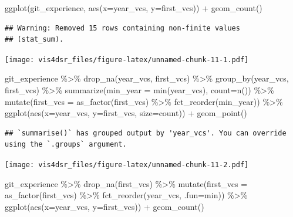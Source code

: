 \documentclass[
]{krantz}
\makeatletter
\newenvironment{Shaded}{\begin{snugshade}}{\end{snugshade}}
\newcommand{\AttributeTok}[1]{\textcolor[rgb]{0.61,0.61,0.61}{#1}}
\newcommand{\FunctionTok}[1]{\textcolor[rgb]{0,0,0}{#1}}
\newcommand{\NormalTok}[1]{#1}
\newcommand{\SpecialCharTok}[1]{\textcolor[rgb]{0,0,0}{#1}}
\newenvironment{kframe}{%
\medskip{}
\setlength{\fboxsep}{.8em}
 \def\at@end@of@kframe{}%
 \ifinner\ifhmode%
  \def\at@end@of@kframe{\end{minipage}}%
  \begin{minipage}{\columnwidth}%
 \fi\fi%
 \def\FrameCommand##1{\hskip\@totalleftmargin \hskip-\fboxsep
 \colorbox{shadecolor}{##1}\hskip-\fboxsep
     \hskip-\linewidth \hskip-\@totalleftmargin \hskip\columnwidth}%
 \MakeFramed {\advance\hsize-\width
   \@totalleftmargin\z@ \linewidth\hsize
   \@setminipage}}%
 {\par\unskip\endMakeFramed%
 \at@end@of@kframe}
\renewenvironment{Shaded}{\begin{kframe}}{\end{kframe}}
\makeatother
\begin{document}
\begin{Shaded}
\begin{Highlighting}[]
\FunctionTok{ggplot}\NormalTok{(git\_experience, }\FunctionTok{aes}\NormalTok{(}\AttributeTok{x=}\NormalTok{year\_vcs, }\AttributeTok{y=}\NormalTok{first\_vcs)) }\SpecialCharTok{+}
  \FunctionTok{geom\_count}\NormalTok{()}
\end{Highlighting}
\end{Shaded}

\begin{verbatim}
## Warning: Removed 15 rows containing non-finite values
## (stat_sum).
\end{verbatim}

\texttt{[image: vis4dsr\_files/figure-latex/unnamed-chunk-11-1.pdf]}

\begin{Shaded}
\begin{Highlighting}[]
\NormalTok{git\_experience }\SpecialCharTok{\%\textgreater{}\%}
  \FunctionTok{drop\_na}\NormalTok{(year\_vcs, first\_vcs) }\SpecialCharTok{\%\textgreater{}\%}
  \FunctionTok{group\_by}\NormalTok{(year\_vcs, first\_vcs) }\SpecialCharTok{\%\textgreater{}\%}
  \FunctionTok{summarize}\NormalTok{(}\AttributeTok{min\_year =} \FunctionTok{min}\NormalTok{(year\_vcs),}
            \AttributeTok{count=}\FunctionTok{n}\NormalTok{()) }\SpecialCharTok{\%\textgreater{}\%}
  \FunctionTok{mutate}\NormalTok{(}\AttributeTok{first\_vcs =} \FunctionTok{as\_factor}\NormalTok{(first\_vcs) }\SpecialCharTok{\%\textgreater{}\%} 
           \FunctionTok{fct\_reorder}\NormalTok{(min\_year)) }\SpecialCharTok{\%\textgreater{}\%}
  \FunctionTok{ggplot}\NormalTok{(}\FunctionTok{aes}\NormalTok{(}\AttributeTok{x=}\NormalTok{year\_vcs, }\AttributeTok{y=}\NormalTok{first\_vcs, }\AttributeTok{size=}\NormalTok{count)) }\SpecialCharTok{+}
  \FunctionTok{geom\_point}\NormalTok{()}
\end{Highlighting}
\end{Shaded}

\begin{verbatim}
## `summarise()` has grouped output by 'year_vcs'. You can override using the `.groups` argument.
\end{verbatim}

\texttt{[image: vis4dsr\_files/figure-latex/unnamed-chunk-11-2.pdf]}

\begin{Shaded}
\begin{Highlighting}[]
\NormalTok{git\_experience }\SpecialCharTok{\%\textgreater{}\%}
  \FunctionTok{drop\_na}\NormalTok{(first\_vcs) }\SpecialCharTok{\%\textgreater{}\%}
  \FunctionTok{mutate}\NormalTok{(}\AttributeTok{first\_vcs =} \FunctionTok{as\_factor}\NormalTok{(first\_vcs) }\SpecialCharTok{\%\textgreater{}\%} 
           \FunctionTok{fct\_reorder}\NormalTok{(year\_vcs, }\AttributeTok{.fun=}\NormalTok{min)) }\SpecialCharTok{\%\textgreater{}\%}
  \FunctionTok{ggplot}\NormalTok{(}\FunctionTok{aes}\NormalTok{(}\AttributeTok{x=}\NormalTok{year\_vcs, }\AttributeTok{y=}\NormalTok{first\_vcs)) }\SpecialCharTok{+}
  \FunctionTok{geom\_count}\NormalTok{()}
\end{Highlighting}
\end{Shaded}
\end{document}
